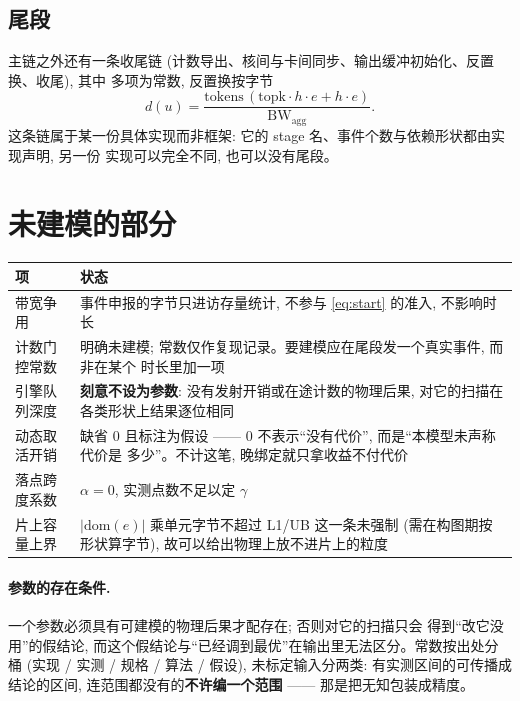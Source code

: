 \documentclass[11pt,a4paper]{article}
\newcommand{\BW}{\mathrm{BW}}
\newcommand{\dom}{\mathrm{dom}}
\begin{document}
\subsection{尾段}
\label{sec:f-tail}

主链之外还有一条收尾链 (计数导出、核间与卡间同步、输出缓冲初始化、反置换、收尾), 其中
多项为常数, 反置换按字节
\begin{equation}
d(u) = \frac{\text{tokens}\,(\text{topk}\cdot h\cdot e + h\cdot e)}{\BW_{\text{agg}}} .
\label{eq:unpermute}
\end{equation}
这条链属于某一份具体实现而非框架: 它的 stage 名、事件个数与依赖形状都由实现声明, 另一份
实现可以完全不同, 也可以没有尾段。

\section{未建模的部分}
\label{sec:gaps}

\begin{center}
\begin{tabular}{@{}lp{8.0cm}@{}}
\toprule
项 & 状态 \\
\midrule
带宽争用 & 事件申报的字节只进访存量统计, 不参与 \eqref{eq:start} 的准入, 不影响时长 \\
计数门控常数 & 明确未建模; 常数仅作复现记录。要建模应在尾段发一个真实事件, 而非在某个
  时长里加一项 \\
引擎队列深度 & \textbf{刻意不设为参数}: 没有发射开销或在途计数的物理后果, 对它的扫描在
  各类形状上结果逐位相同 \\
动态取活开销 & 缺省 0 且标注为假设 —— 0 不表示``没有代价'', 而是``本模型未声称代价是
  多少''。不计这笔, 晚绑定就只拿收益不付代价 \\
落点跨度系数 & $\alpha=0$, 实测点数不足以定 $\gamma$ \\
片上容量上界 & $|\dom(e)|$ 乘单元字节不超过 L1/UB 这一条未强制 (需在构图期按形状算字节),
  故可以给出物理上放不进片上的粒度 \\
\bottomrule
\end{tabular}
\end{center}

\paragraph{参数的存在条件.} 一个参数必须具有可建模的物理后果才配存在; 否则对它的扫描只会
得到``改它没用''的假结论, 而这个假结论与``已经调到最优''在输出里无法区分。常数按出处分桶
(实现 / 实测 / 规格 / 算法 / 假设), 未标定输入分两类: 有实测区间的可传播成结论的区间,
连范围都没有的\textbf{不许编一个范围} —— 那是把无知包装成精度。

\end{document}
